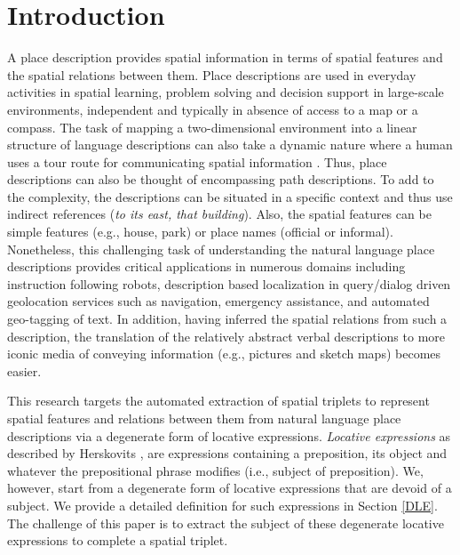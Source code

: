 \documentclass{sig-alternate}
\begin{document}
\section{Introduction}
A place description provides spatial information in terms of spatial features and the spatial relations between them. Place descriptions are used in everyday activities in spatial learning, problem solving and decision support in large-scale environments, independent and typically in absence of access to a map or a compass. The task of mapping a two-dimensional environment into a linear structure of language descriptions can also take a dynamic nature where a human uses a tour route for communicating spatial information \cite{linde:spatial, daniel:modes}. Thus, place descriptions can also be thought of encompassing path descriptions. To add to the complexity, the descriptions can be situated in a specific context and thus use indirect references (\textit{to its east, that building}). 
Also, the spatial features can be simple features (e.g., house, park) or place names (official or informal). 
Nonetheless, this challenging task of understanding the natural language place descriptions provides critical applications in numerous domains including instruction following robots, description based localization in query/dialog driven geolocation services such as navigation, emergency assistance, and automated geo-tagging of text. In addition, having inferred the spatial relations from such a description, the translation of the relatively abstract verbal descriptions to more iconic media of conveying information (e.g., pictures and sketch maps) becomes easier.

This research targets the automated extraction of spatial triplets to represent spatial features and relations between them from natural language place descriptions via a degenerate form of locative expressions. \textit{Locative expressions} as described by Herskovits \cite{herskovits:pragmatics}, are expressions containing a preposition, its object and whatever the prepositional phrase modifies (i.e., subject of preposition). We, however, start from a degenerate form of locative expressions that are devoid of a subject. We provide a detailed definition for such expressions in Section \ref{DLE}. The challenge of this paper is to extract the subject of these degenerate locative expressions to complete a spatial triplet.
\end{document}
